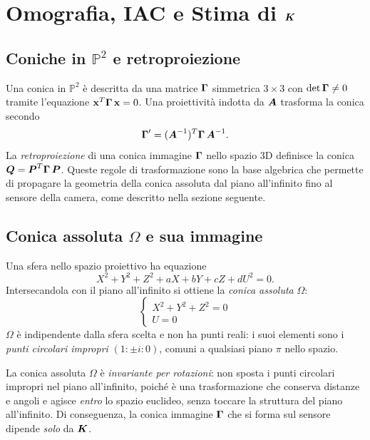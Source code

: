 \section{Omografia, IAC e Stima di \texorpdfstring{\(\boldsymbol{K}\)}{K}}
\label{sec:omografia_calibrazione}

\subsection{Coniche in \(\mathbb{P}^2\) e retroproiezione}
\label{sub:coniche}

Una conica in \(\mathbb{P}^2\) è descritta da una matrice
\(\boldsymbol{\Gamma}\) simmetrica \(3\times3\) con \(\det\boldsymbol{\Gamma}\neq0\)
tramite l'equazione \(\mathbf{x}^T \boldsymbol{\Gamma}\, \mathbf{x} = 0\).
Una proiettività indotta da \(\boldsymbol{A}\) trasforma la conica secondo
\[
  \boldsymbol{\Gamma}' = (\boldsymbol{A}^{-1})^T \boldsymbol{\Gamma}\, \boldsymbol{A}^{-1}.
\]
La \emph{retroproiezione} di una conica immagine \(\boldsymbol{\Gamma}\)
nello spazio 3D definisce la conica
\(\boldsymbol{Q} = \boldsymbol{P}^T \boldsymbol{\Gamma}\, \boldsymbol{P}\).
Queste regole di trasformazione sono la base algebrica che permette
di propagare la geometria della conica assoluta dal piano all'infinito
fino al sensore della camera, come descritto nella sezione seguente.

\subsection{Conica assoluta \(\Omega\) e sua immagine}
\label{sub:conica_assoluta}

Una sfera nello spazio proiettivo ha equazione
\[
  X^2 + Y^2 + Z^2 + aX + bY + cZ + dU^2 = 0.
\]
Intersecandola con il piano all'infinito si ottiene la
\emph{conica assoluta} \(\Omega\):
\[
  \begin{cases}
    X^2 + Y^2 + Z^2 = 0 \\
    U = 0
  \end{cases}
\]
\(\Omega\) è indipendente dalla sfera scelta e non ha punti reali:
i suoi elementi sono i \emph{punti circolari impropri}
\((1:\pm i:0)\), comuni a qualsiasi piano \(\pi\) nello spazio.

\begin{oss}
La conica assoluta \(\Omega\) è \emph{invariante per rotazioni}: non sposta i punti circolari impropri nel piano
all'infinito, poiché è una trasformazione che conserva distanze e
angoli e agisce \emph{entro} lo spazio euclideo, senza toccare la
struttura del piano all'infinito. Di conseguenza, la conica immagine
\(\boldsymbol{\Gamma}\) che si forma sul sensore dipende \emph{solo} da
\(\boldsymbol{K}\).
\end{oss}

